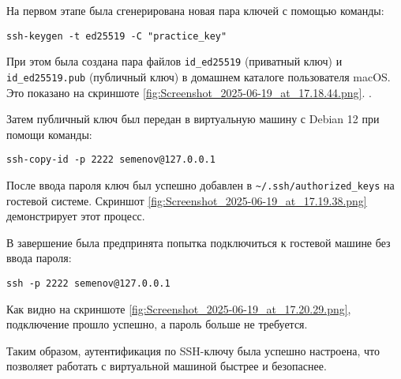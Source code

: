 На первом этапе была сгенерирована новая пара ключей с помощью команды:
\begin{verbatim}
ssh-keygen -t ed25519 -C "practice_key"
\end{verbatim}
При этом была создана пара файлов \verb|id_ed25519| (приватный ключ) и \verb|id_ed25519.pub| (публичный ключ) в домашнем каталоге пользователя macOS. Это показано на скриншоте \ref{fig:Screenshot_2025-06-19_at_17.18.44.png}.
.

Затем публичный ключ был передан в виртуальную машину с Debian 12 при помощи команды:
\begin{verbatim}
ssh-copy-id -p 2222 semenov@127.0.0.1
\end{verbatim}
После ввода пароля ключ был успешно добавлен в \verb|~/.ssh/authorized_keys| на гостевой системе. Скриншот \ref{fig:Screenshot_2025-06-19_at_17.19.38.png} демонстрирует этот процесс.


В завершение была предпринята попытка подключиться к гостевой машине без ввода пароля:
\begin{verbatim}
ssh -p 2222 semenov@127.0.0.1
\end{verbatim}
Как видно на скриншоте \ref{fig:Screenshot_2025-06-19_at_17.20.29.png}, подключение прошло успешно, а пароль больше не требуется.


Таким образом, аутентификация по SSH-ключу была успешно настроена, что позволяет работать с виртуальной машиной быстрее и безопаснее.

